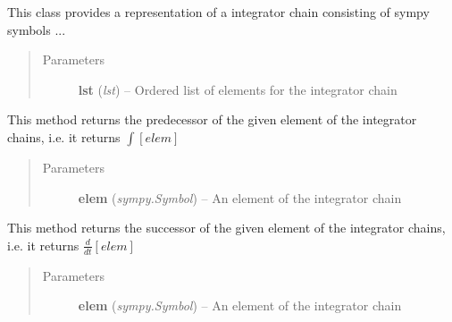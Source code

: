 \documentclass[letterpaper,10pt,english]{sphinxmanual}
\begin{document}
\begin{fulllineitems}
\label{pytrajectory:pytrajectory.utilities.IntegChain}
This class provides a representation of a integrator chain consisting of sympy symbols ...
\begin{quote}\begin{description}
\item[{Parameters}] \leavevmode
\textbf{lst} (\emph{lst}) -- Ordered list of elements for the integrator chain

\end{description}\end{quote}

\begin{fulllineitems}
\label{pytrajectory:pytrajectory.utilities.IntegChain.predecessor}
This method returns the predecessor of the given element of the
integrator chains, i.e. it returns \(\int [elem]\)
\begin{quote}\begin{description}
\item[{Parameters}] \leavevmode
\textbf{elem} (\emph{sympy.Symbol}) -- An element of the integrator chain

\end{description}\end{quote}

\end{fulllineitems}


\begin{fulllineitems}
\label{pytrajectory:pytrajectory.utilities.IntegChain.successor}
This method returns the successor of the given element of the
integrator chains, i.e. it returns \(\frac{d}{dt}[elem]\)
\begin{quote}\begin{description}
\item[{Parameters}] \leavevmode
\textbf{elem} (\emph{sympy.Symbol}) -- An element of the integrator chain

\end{description}\end{quote}

\end{fulllineitems}


\end{fulllineitems}
\end{document}
